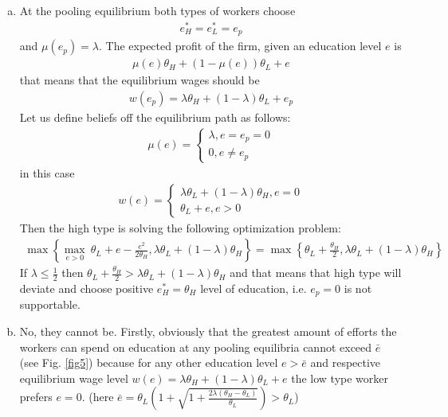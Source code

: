 \documentclass[a4paper]{article}
\begin{document}
\begin{enumerate}
	\begin{enumerate}[(a)]
	\item At the pooling equilibrium both types of workers choose
	\begin{align*}
	e^*_H = e^*_L = e_p
	\end{align*}
	and $\mu(e_p) = \lambda$. The expected profit of the firm, given an education level $e$ is
	\begin{align*}
	\mu(e) \theta_H + (1 - \mu(e)) \theta_L + e
	\end{align*}
	that means that the equilibrium wages should be
	\begin{align*}
	w(e_p) =  \lambda \theta_H + (1 - \lambda) \theta_L + e_p
	\end{align*} 
	Let us define beliefs off the equilibrium path as follows:
	\begin{align*}
	\mu(e) = \begin{cases}
	\lambda, e=e_p = 0\\
	0, e \neq e_p
	\end{cases}
	\end{align*}
	in this case
	\begin{align*}
	w(e) = \begin{cases}
	\lambda \theta_L + (1 - \lambda) \theta_H, e = 0\\
	\theta_L + e, e > 0
	\end{cases}
	\end{align*}
	Then the high type is solving the following optimization problem:
	\begin{align*}
	\max\left\{ \underset{e > 0}{\max}\ \theta_L + e - \frac{e^2}{2\theta_H}, \lambda \theta_L + (1 - \lambda) \theta_H \right\} = \max\left\{\theta_L + \frac{\theta_H}{2}, \lambda \theta_L + (1 - \lambda) \theta_H \right\}
	\end{align*}
	If $\lambda \le \frac{1}{2}$ then $\theta_L + \frac{\theta_H}{2} > \lambda \theta_L + (1 - \lambda)\theta_H$ and that means that high type will deviate and choose positive $e^*_H = \theta_H$ level of education, i.e. $e_p = 0$ is not supportable.
	\item No, they cannot be. Firstly, obviously that the greatest amount of efforts the workers can spend on education at any pooling equilibria cannot exceed $\bar{e}$ (see Fig. \ref{fig5}) because for any other education level $e > \bar{e}$ and respective equilibrium wage level $w(e) = \lambda \theta_H + (1 - \lambda)\theta_L + e$ the low type worker prefers $e = 0$. (here $\bar{e} = \theta_L\left(1 + \sqrt{1 + \frac{2\lambda(\theta_H - \theta_L)}{\theta_L}}\right) > \theta_L$)

\end{enumerate}
\end{enumerate}
\end{document}
